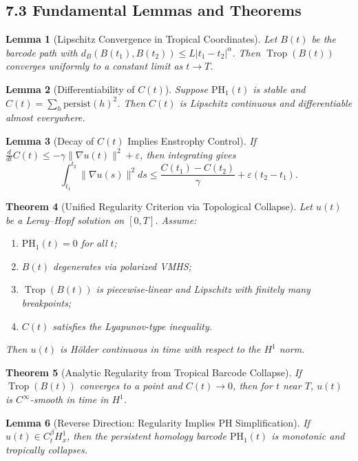 \documentclass[11pt]{article}
\newtheorem{theorem}{Theorem}[section]
\newtheorem{lemma}[theorem]{Lemma}
\theoremstyle{definition}
\begin{document}
\subsection*{7.3 Fundamental Lemmas and Theorems}

\begin{lemma}[Lipschitz Convergence in Tropical Coordinates]
Let $B(t)$ be the barcode path with $d_B(B(t_1), B(t_2)) \leq L |t_1 - t_2|^\alpha$. Then $\operatorname{Trop}(B(t))$ converges uniformly to a constant limit as $t \to T$.
\end{lemma}

\begin{lemma}[Differentiability of $C(t)$]
Suppose $\mathrm{PH}_1(t)$ is stable and $C(t) = \sum_{h} \mathrm{persist}(h)^2$. Then $C(t)$ is Lipschitz continuous and differentiable almost everywhere.
\end{lemma}

\begin{lemma}[Decay of $C(t)$ Implies Enstrophy Control]
If $\frac{d}{dt} C(t) \leq -\gamma \|\nabla u(t)\|^2 + \varepsilon$, then integrating gives
\[\int_{t_1}^{t_2} \|\nabla u(s)\|^2 ds \leq \frac{C(t_1) - C(t_2)}{\gamma} + \varepsilon (t_2 - t_1).\]
\end{lemma}

\begin{theorem}[Unified Regularity Criterion via Topological Collapse]
Let $u(t)$ be a Leray--Hopf solution on $[0,T]$. Assume:
\begin{enumerate}
  \item $\mathrm{PH}_1(t) = 0$ for all $t$;
  \item $B(t)$ degenerates via polarized VMHS;
  \item $\operatorname{Trop}(B(t))$ is piecewise-linear and Lipschitz with finitely many breakpoints;
  \item $C(t)$ satisfies the Lyapunov-type inequality.
\end{enumerate}
Then $u(t)$ is Hölder continuous in time with respect to the $H^1$ norm.
\end{theorem}

\begin{theorem}[Analytic Regularity from Tropical Barcode Collapse]
If $\operatorname{Trop}(B(t))$ converges to a point and $C(t) \to 0$, then for $t$ near $T$, $u(t)$ is $C^\infty$-smooth in time in $H^1$.
\end{theorem}

\begin{lemma}[Reverse Direction: Regularity Implies PH Simplification]
If $u(t) \in C^\beta_t H^1_x$, then the persistent homology barcode $\mathrm{PH}_1(t)$ is monotonic and tropically collapses.
\end{lemma}
\end{document}

